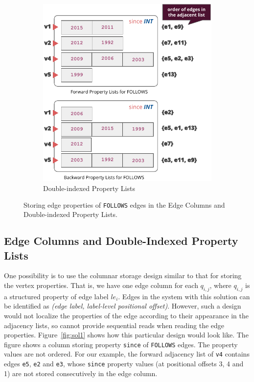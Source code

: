\begin{figure}
\begin{subfigure}{0.55\textwidth}
		\includegraphics[scale=0.69]{img/sol2}
		\captionsetup{justification=centering}
		\caption{Double-indexed Property Lists}
		\label{fig:sol2}
	\end{subfigure}
	\captionsetup{justification=centering}
	\caption{Storing edge properties of \texttt{FOLLOWS} edges in the Edge Columns and Double-indexed Property Lists.}
	\label{fig:sol1and2}
\end{figure}

\subsection{Edge Columns and Double-Indexed Property Lists}
\label{sec:edge-cols-prop-lists}

 One possibility is to use the columnar storage design similar to that for storing the vertex properties. That is, we have one edge column for each $q_{i,j}$, where $q_{i,j}$ is a structured property of edge label $le_i$. Edges in the system with this solution can be identified as \emph{(edge label, label-level positional offset)}. However, such a design would not localize the properties of the edge according to their appearance in the adjacency lists, so cannot provide sequential reads when reading the edge properties. Figure~\ref{fig:sol1} shows how this particular design would look like. The figure shows a column storing property \texttt{since} of \texttt{FOLLOWS} edges. The property values are not ordered. For our example, the forward adjacency list of \texttt{v4} contains edges \texttt{e5}, \texttt{e2} and \texttt{e3}, whose \texttt{since} property values (at positional offsets 3, 4 and 1) are not stored consecutively in the edge column. 

